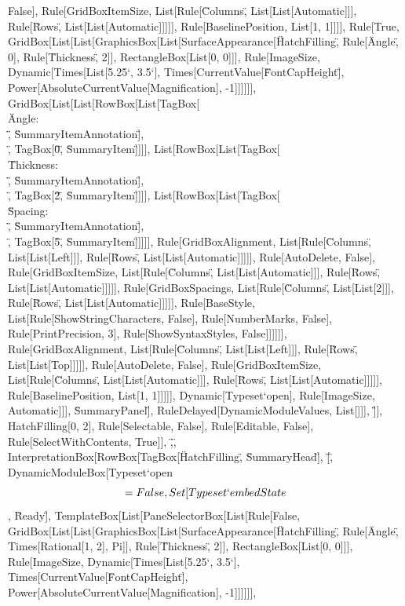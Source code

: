 \documentclass{article}
\begin{document}
{{{{False], Rule[GridBoxItemSize, List[Rule[\"Columns\", List[List[Automatic]]], Rule[\"Rows\", List[List[Automatic]]]]], Rule[BaselinePosition, List[1,
1]]]], Rule[True, GridBox[List[List[GraphicsBox[List[SurfaceAppearance[\"HatchFilling\", Rule[\"Angle\", 0], Rule[\"Thickness\", 2]], RectangleBox[List[0,
0]]], Rule[ImageSize, Dynamic[Times[List[5.25`, 3.5`], Times[CurrentValue[\"FontCapHeight\"], Power[AbsoluteCurrentValue[Magnification], -1]]]]]],
GridBox[List[List[RowBox[List[TagBox[\"\\\"Angle: \\\"\", \"SummaryItemAnnotation\"], \"\\[InvisibleSpace]\", TagBox[\"0\", \"SummaryItem\"]]]],
List[RowBox[List[TagBox[\"\\\"Thickness: \\\"\", \"SummaryItemAnnotation\"], \"\\[InvisibleSpace]\", TagBox[\"2\", \"SummaryItem\"]]]], List[RowBox[List[TagBox[\"\\\"Spacing:
\\\"\", \"SummaryItemAnnotation\"], \"\\[InvisibleSpace]\", TagBox[\"5\", \"SummaryItem\"]]]]], Rule[GridBoxAlignment, List[Rule[\"Columns\", List[List[Left]]],
Rule[\"Rows\", List[List[Automatic]]]]], Rule[AutoDelete, False], Rule[GridBoxItemSize, List[Rule[\"Columns\", List[List[Automatic]]], Rule[\"Rows\",
List[List[Automatic]]]]], Rule[GridBoxSpacings, List[Rule[\"Columns\", List[List[2]]], Rule[\"Rows\", List[List[Automatic]]]]], Rule[BaseStyle, List[Rule[ShowStringCharacters,
False], Rule[NumberMarks, False], Rule[PrintPrecision, 3], Rule[ShowSyntaxStyles, False]]]]]], Rule[GridBoxAlignment, List[Rule[\"Columns\", List[List[Left]]],
Rule[\"Rows\", List[List[Top]]]]], Rule[AutoDelete, False], Rule[GridBoxItemSize, List[Rule[\"Columns\", List[List[Automatic]]], Rule[\"Rows\", List[List[Automatic]]]]],
Rule[BaselinePosition, List[1, 1]]]]], Dynamic[Typeset`open$$], Rule[ImageSize, Automatic]]], \"SummaryPanel\"], RuleDelayed[DynamicModuleValues,
List[]]], \"]\"}], HatchFilling[0, 2], Rule[Selectable, False], Rule[Editable, False], Rule[SelectWithContents, True]], \",\", InterpretationBox[RowBox[{TagBox[\"HatchFilling\",
\"SummaryHead\"], \"[\", DynamicModuleBox[{Typeset`open$$ = False, Set[Typeset`embedState$$, \"Ready\"]}, TemplateBox[List[PaneSelectorBox[List[Rule[False,
GridBox[List[List[GraphicsBox[List[SurfaceAppearance[\"HatchFilling\", Rule[\"Angle\", Times[Rational[1, 2], Pi]], Rule[\"Thickness\", 2]], RectangleBox[List[0,
0]]], Rule[ImageSize, Dynamic[Times[List[5.25`, 3.5`], Times[CurrentValue[\"FontCapHeight\"], Power[AbsoluteCurrentValue[Magnification], -1]]]]]],
}}}}
\end{document}
